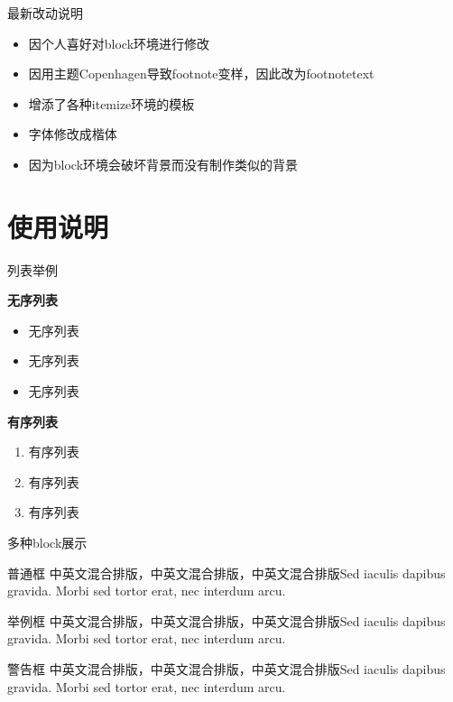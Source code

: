 \documentclass{beamer}
\begin{document}
\begin{frame}{最新改动说明}
	\begin{itemize}[<+-| structure@+>]
		\item 因个人喜好对block环境进行修改
        \item 因用主题Copenhagen导致footnote变样，因此改为footnotetext
		\item 增添了各种itemize环境的模板
        \item 字体修改成楷体
        \item 因为block环境会破坏背景而没有制作类似的背景
	\end{itemize}
\end{frame}

\section{使用说明}

\begin{frame}{列表举例}
	\begin{block}{\textbf{无序列表}}
		\begin{itemize}
			\item 无序列表
			\item 无序列表
			\item 无序列表
		\end{itemize}
	\end{block}
	
	\begin{block}{\textbf{有序列表}}
		\begin{enumerate}
			\item 有序列表
			\item 有序列表
			\item 有序列表
		\end{enumerate}
	\end{block}
\end{frame}

\begin{frame}{多种block展示}
	\begin{block}{普通框}
		中英文混合排版，中英文混合排版，中英文混合排版Sed iaculis
		dapibus gravida. Morbi sed tortor erat, nec interdum arcu. 
	\end{block}
	\begin{exampleblock}{举例框}
		中英文混合排版，中英文混合排版，中英文混合排版Sed iaculis
		dapibus gravida. Morbi sed tortor erat, nec interdum arcu.
	\end{exampleblock}
	\begin{alertblock}{警告框}
		中英文混合排版，中英文混合排版，中英文混合排版Sed iaculis
		dapibus gravida. Morbi sed tortor erat, nec interdum arcu.
	\end{alertblock}
\end{frame}
\end{document}

